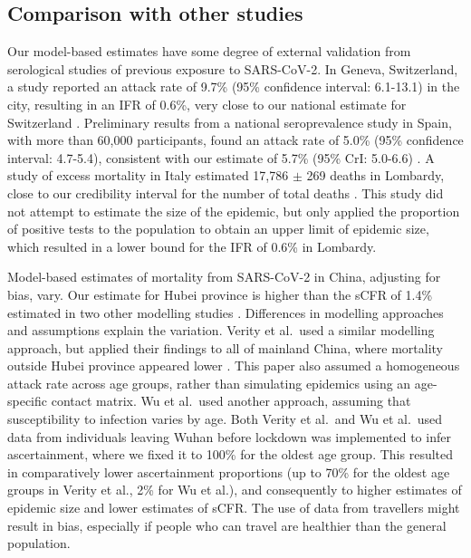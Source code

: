 \documentclass{article}
\begin{document}
\subsection*{Comparison with other studies}

Our model-based estimates have some degree of external validation from serological studies of previous exposure to SARS-CoV-2. 
In Geneva, Switzerland, a study reported an attack rate of 9.7\% (95\% confidence interval: 6.1-13.1) in the city, resulting in an IFR of 0.6\%, very close to our national estimate for Switzerland \cite{Stringhini1101}. 
Preliminary results from a national seroprevalence study in Spain, with more than 60,000 participants, found an attack rate of 5.0\% (95\% confidence interval: 4.7-5.4), consistent with our estimate of 5.7\% (95\% CrI: 5.0-6.6) \cite{MinisteriodeSanidad_sero}. 
A study of excess mortality in Italy estimated 17,786 $\pm$ 269 deaths in Lombardy, close to our credibility interval for the number of total deaths \cite{modi2020total}.
This study did not attempt to estimate the size of the epidemic, but only applied the proportion of positive tests to the population to obtain an upper limit of epidemic size, which resulted in a lower bound for the IFR of 0.6\% in Lombardy.

Model-based estimates of mortality from SARS-CoV-2 in China, adjusting for bias, vary. 
Our estimate for Hubei province is higher than the sCFR of 1.4\% estimated in two other modelling studies \cite{verity2020estimates,wu2020estimating}. 
Differences in modelling approaches and assumptions explain the variation. 
Verity et al.~used a similar modelling approach, but applied their findings to all of mainland China, where mortality outside Hubei province appeared lower \cite{Team2020}. 
This paper also assumed a homogeneous attack rate across age groups, rather than simulating epidemics using an age-specific contact matrix. 
Wu et al.~used another approach, assuming that susceptibility to infection varies by age. 
Both Verity et al.~and Wu et al.~used data from individuals leaving Wuhan before lockdown was implemented to infer ascertainment, where we fixed it to 100\% for the oldest age group. 
This resulted in comparatively lower ascertainment proportions (up to 70\% for the oldest age groups in Verity et al., 2\% for Wu et al.), and consequently to higher estimates of epidemic size and lower estimates of sCFR. 
The use of data from travellers might result in bias, especially if people who can travel are healthier than the general population.
 
\end{document}
